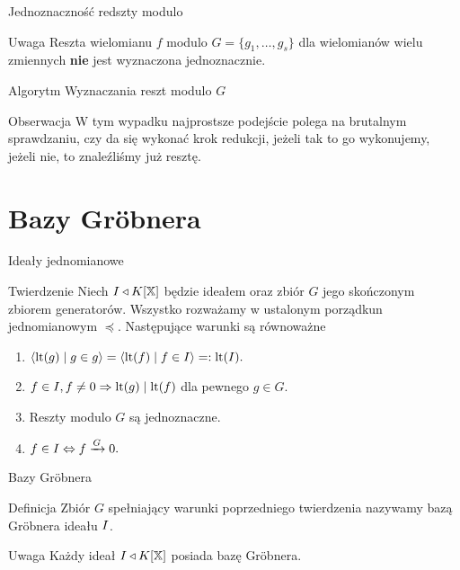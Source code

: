 \documentclass{beamer}
\newcommand{\II}{\mathnormal{I}}
\newcommand{\lt}{\textrm{lt}}
\begin{document}
\begin{frame}{Jednoznaczność redszty modulo}
    \begin{alertblock}{Uwaga}
        Reszta wielomianu $f$ modulo $G = \{g_1, \ldots, g_s\}$ dla wielomianów wielu zmiennych \textbf{nie} jest wyznaczona jednoznacznie.
    \end{alertblock}
\end{frame}

\begin{frame}{Algorytm Wyznaczania reszt modulo $G$}
    \begin{alertblock}{Obserwacja}
        W tym wypadku najprostsze podejście polega na brutalnym sprawdzaniu, czy da się wykonać krok redukcji, jeżeli tak to go wykonujemy, jeżeli nie, to znaleźliśmy już resztę.
    \end{alertblock}
\end{frame}

\section{Bazy Gr{\"o}bnera}
\begin{frame}{Ideały jednomianowe}
    \begin{block}{Twierdzenie}
        Niech $\II \triangleleft K[\mathbb{X}]$ będzie ideałem oraz zbiór $G$ jego skończonym zbiorem generatorów. Wszystko rozważamy w ustalonym porządkun jednomianowym $\preceq$. Następujące warunki są równoważne 
        \begin{enumerate}
            \item $\langle \lt(g) \mid g \in g \rangle = \langle \lt (f) \mid f \in \II \rangle =: \lt (\II).$
            \item $f \in \II , f \neq 0  \Rightarrow \lt (g) \mid \lt(f) $ dla pewnego $g \in G$. 
            \item Reszty modulo $G$ są jednoznaczne. 
            \item $f \in \II \Leftrightarrow f \xrightarrow{G} 0.$
        \end{enumerate}
    \end{block}
\end{frame}

\begin{frame}{Bazy Gr\"obnera}
    \begin{block}{Definicja}
        Zbiór $G$ spełniający warunki poprzedniego twierdzenia nazywamy \alert{bazą Gr\"obnera} ideału $\II$.
    \end{block}
    \pause 
    \begin{alertblock}{Uwaga}
        Każdy ideał $\II \triangleleft K[\mathbb{X}]$ posiada bazę Gr\"obnera.
    \end{alertblock}
\end{frame}
\end{document}
